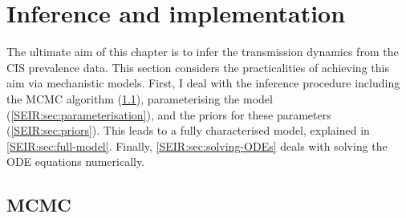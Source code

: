 \documentclass[thesis.tex]{subfiles}
\begin{document}
\section{Inference and implementation} \label{SEIR:sec:inference-implementation}

The ultimate aim of this chapter is to infer the transmission dynamics from the CIS prevalence data.
This section considers the practicalities of achieving this aim via mechanistic models.
First, I deal with the inference procedure including the MCMC algorithm (\cref{SEIR:sec:MCMC}), parameterising the model (\cref{SEIR:sec:parameterisation}), and the priors for these parameters (\cref{SEIR:sec:priors}).
This leads to a fully characterised model, explained in \cref{SEIR:sec:full-model}.
Finally, \cref{SEIR:sec:solving-ODEs} deals with solving the ODE equations numerically.

\subsection{MCMC} \label{SEIR:sec:MCMC}
\end{document}
